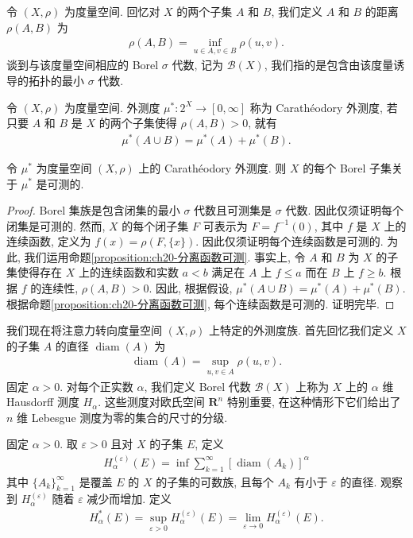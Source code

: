 \documentclass[../../main.tex]{subfiles}
\begin{document}
令 $(X,\rho)$ 为度量空间. 回忆对 $X$ 的两个子集 $A$ 和 $B$, 我们定义 $A$ 和 $B$ 的距离 $\rho(A,B)$ 为
\begin{align*}
\rho(A,B)=\inf_{u\in A,v\in B}\rho(u,v).
\end{align*}
谈到与该度量空间相应的 Borel $\sigma$ 代数, 记为 $\mathcal{B}(X)$, 我们指的是包含由该度量诱导的拓扑的最小 $\sigma$ 代数.

\begin{definition}\label{definition:ch20-caratheodory外测度}
令 $(X,\rho)$ 为度量空间. 外测度 $\mu^{*}:2^{X}\to[0,\infty]$ 称为 Carath\'eodory 外测度, 若只要 $A$ 和 $B$ 是 $X$ 的两个子集使得 $\rho(A,B)>0$, 就有
\begin{align*}
\mu^{*}(A\cup B)=\mu^{*}(A)+\mu^{*}(B).
\end{align*}
\end{definition}

\begin{theorem}\label{theorem:ch20-borel可测}
令 $\mu^{*}$ 为度量空间 $(X,\rho)$ 上的 Carath\'eodory 外测度. 则 $X$ 的每个 Borel 子集关于 $\mu^{*}$ 是可测的.
\end{theorem}

\begin{proof}
Borel 集族是包含闭集的最小 $\sigma$ 代数且可测集是 $\sigma$ 代数. 因此仅须证明每个闭集是可测的. 然而, $X$ 的每个闭子集 $F$ 可表示为 $F=f^{-1}(0)$, 其中 $f$ 是 $X$ 上的连续函数, 定义为 $f(x)=\rho(F,\{x\})$. 因此仅须证明每个连续函数是可测的. 为此, 我们运用命题\cref{proposition:ch20-分离函数可测}. 事实上, 令 $A$ 和 $B$ 为 $X$ 的子集使得存在 $X$ 上的连续函数和实数 $a<b$ 满足在 $A$ 上 $f\leqslant a$ 而在 $B$ 上 $f\geqslant b$. 根据 $f$ 的连续性, $\rho(A,B)>0$. 因此, 根据假设, $\mu^{*}(A\cup B)=\mu^{*}(A)+\mu^{*}(B)$. 根据命题\cref{proposition:ch20-分离函数可测}, 每个连续函数是可测的. 证明完毕.
\end{proof}

我们现在将注意力转向度量空间 $(X,\rho)$ 上特定的外测度族. 首先回忆我们定义 $X$ 的子集 $A$ 的直径 $\operatorname{diam}(A)$ 为
\begin{align*}
\operatorname{diam}(A)=\sup_{u,v\in A}\rho(u,v).
\end{align*}
固定 $\alpha>0$. 对每个正实数 $\alpha$, 我们定义 Borel 代数 $\mathcal{B}(X)$ 上称为 $X$ 上的 $\alpha$ 维 Hausdorff 测度 $H_{\alpha}$. 这些测度对欧氏空间 $\mathbf{R}^{n}$ 特别重要, 在这种情形下它们给出了 $n$ 维 Lebesgue 测度为零的集合的尺寸的分级.

固定 $\alpha>0$. 取 $\varepsilon>0$ 且对 $X$ 的子集 $E$, 定义
\begin{align*}
H_{\alpha}^{(\varepsilon)}(E)=\inf\sum_{k=1}^{\infty}[\operatorname{diam}(A_{k})]^{\alpha}
\end{align*}
其中 $\{A_{k}\}_{k=1}^{\infty}$ 是覆盖 $E$ 的 $X$ 的子集的可数族, 且每个 $A_{k}$ 有小于 $\varepsilon$ 的直径. 观察到 $H_{\alpha}^{(\varepsilon)}$ 随着 $\varepsilon$ 减少而增加. 定义
\begin{align*}
H_{\alpha}^{*}(E)=\sup_{\varepsilon>0}H_{\alpha}^{(\varepsilon)}(E)=\lim_{\varepsilon\to 0}H_{\alpha}^{(\varepsilon)}(E).
\end{align*}
\end{document}

